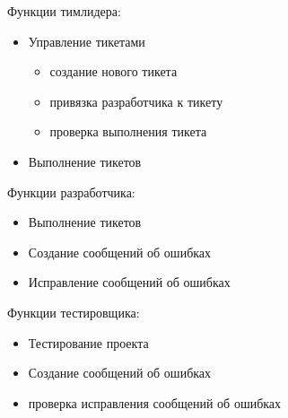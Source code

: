 Функции тимлидера:
\begin{itemize}
	\item Управление тикетами
	\begin{itemize}
		\item создание нового тикета
		\item привязка разработчика к тикету
		\item проверка выполнения тикета
	\end{itemize}
	
	\item Выполнение тикетов
\end{itemize}

Функции разработчика:
\begin{itemize}
	\item Выполнение тикетов
	\item Создание сообщений об ошибках
	\item Исправление сообщений об ошибках
\end{itemize}

Функции тестировщика:
\begin{itemize}
	\item Тестирование проекта
	\item Создание сообщений об ошибках
	\item проверка исправления сообщений об ошибках
\end{itemize}